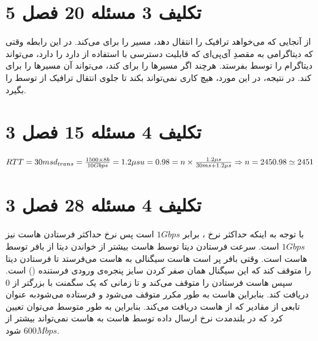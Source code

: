 \documentclass{article}
\begin{document}
\section{تکلیف 3 مسئله 20 فصل 5}
از آنجایی که  می‌خواهد ترافیک  را انتقال دهد، مسیر را برای   می‌کند. در این رابطه وقتی که  دیتاگرامی به مقصدِ آی‌پی‌ای که قابلیت دسترسی با استفاده از  دارد را دارد،  می‌تواند دیتاگرام را توسط  بفرستد. هرچند اگر  مسیرها را برای   کند،  می‌تواند آن مسیرها را برای   کند. در نتیجه، در این مورد،  هیچ کاری نمی‌تواند بکند تا جلوی انتقال ترافیک از  توسط  را بگیرد.

\section{تکلیف 4 مسئله 15 فصل 3}
$
RTT = 30 ms \\
d_{trans} = \frac{1500 \times 8 b}{10 Gbps} = 1.2 \mu s \\
u = 0.98 = n \times \frac{1.2 \mu s}{30 ms + 1.2 \mu s} \\
\Rightarrow n = 2450.98 \simeq 2451 \\
$

\section{تکلیف 4 مسئله 28 فصل 3}
با توجه به اینکه حداکثر نرخ ، برابر $1 Gbps$ است پس نرخ حداکثر فرستادن هاست  نیز $1 Gbps$ است. سرعت فرستادن دیتا توسط هاست  بیشتر از خواندن دیتا از بافر توسط هاست  است. وقتی بافر پر است هاست  سیگنالی به هاست  می‌فرستد تا فرستادن دیتا را متوقف کند که این سیگنال همان صفر کردن سایز پنجره‌ی ورودی فرستنده () است. سپس هاست  فرستادن را متوقف می‌کند و تا زمانی که یک سگمنت  با  بزرگتر از 0 دریافت کند. بنابراین هاست  به طور مکرر متوقف می‌شود و فرستاده می‌شودبه عنوان تابعی از مقادیر  که از هاست  دریافت می‌کند. بنابراین به طور متوسط می‌توان تعیین کرد که در بلندمدت نرخ ارسال داده توسط هاست  به هاست  نمی‌تواند بیشتر از $600 Mbps$ شود.


\renewcommand{\section}[2]{}%
\begin{thebibliography}{99} %


\begin{LTRitems}

\resetlatinfont

\end{LTRitems}

\end{thebibliography}
\end{document}
